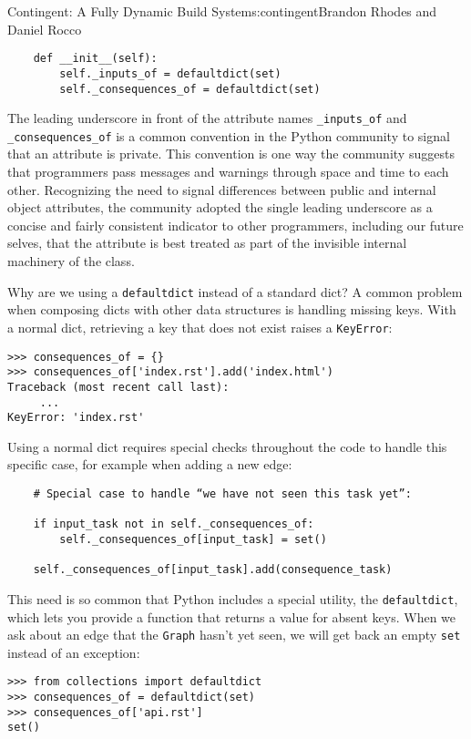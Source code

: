\begin{aosachapter}{Contingent: A Fully Dynamic Build System}{s:contingent}{Brandon Rhodes and Daniel Rocco}
\begin{verbatim}
    def __init__(self):
        self._inputs_of = defaultdict(set)
        self._consequences_of = defaultdict(set)
\end{verbatim}

The leading underscore in front of the attribute names
\texttt{\_inputs\_of} and \texttt{\_consequences\_of} is a common
convention in the Python community to signal that an attribute is
private. This convention is one way the community suggests that
programmers pass messages and warnings through space and time to each
other. Recognizing the need to signal differences between public and
internal object attributes, the community adopted the single leading
underscore as a concise and fairly consistent indicator to other
programmers, including our future selves, that the attribute is best
treated as part of the invisible internal machinery of the class.

Why are we using a \texttt{defaultdict} instead of a standard dict? A
common problem when composing dicts with other data structures is
handling missing keys. With a normal dict, retrieving a key that does
not exist raises a \texttt{KeyError}:

\begin{verbatim}
>>> consequences_of = {}
>>> consequences_of['index.rst'].add('index.html')
Traceback (most recent call last):
     ...
KeyError: 'index.rst'
\end{verbatim}

Using a normal dict requires special checks throughout the code to
handle this specific case, for example when adding a new edge:

\begin{verbatim}
    # Special case to handle “we have not seen this task yet”:

    if input_task not in self._consequences_of:
        self._consequences_of[input_task] = set()

    self._consequences_of[input_task].add(consequence_task)
\end{verbatim}

This need is so common that Python includes a special utility, the
\texttt{defaultdict}, which lets you provide a function that returns a
value for absent keys. When we ask about an edge that the \texttt{Graph}
hasn't yet seen, we will get back an empty \texttt{set} instead of an
exception:

\begin{verbatim}
>>> from collections import defaultdict
>>> consequences_of = defaultdict(set)
>>> consequences_of['api.rst']
set()
\end{verbatim}


\end{aosachapter}
